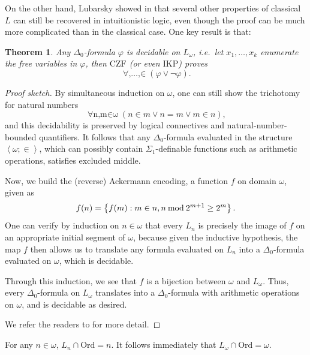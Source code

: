 \documentclass[12pt,openany]{book}
\theoremstyle{plain}
\newtheorem{theorem}{Theorem}[section]
\theoremstyle{definition}
\newcommand\uppar[1]{{\upshape(}#1{\upshape)}}
\newcommand\tuple[1]{\left\langle #1 \right\rangle}
\newcommand\opA[1]{\mathop{\forall #1}}
\newcommand\CZF{\mathrm{CZF}}
\newcommand\IKP{\mathrm{IKP}}
\newcommand\Ord{\mathrm{Ord}}
\begin{document}
On the other hand, Lubarsky showed in \cite{lubarsky93-intuitionistic-l} that several other properties of classical $L$ can still be recovered in intuitionistic logic, even though the proof can be much more complicated than in the classical case. One key result is that:
\begin{theorem}
  \label{thm:l-omega-dec}
  Any $\Delta_0$-formula $\varphi$ is decidable on $L_\omega$, i.e.\ let $x_1, \ldots, x_k$ enumerate the free variables in $\varphi$, then $\CZF$ \uppar{or even $\IKP$} proves
  \[\opA{x_1, \ldots, x_k \in L_\omega} \left(\varphi \lor \neg \varphi\right).\]
\end{theorem}

\begin{proof}[Proof sketch]
  By simultaneous induction on $\omega$, one can still show the trichotomy for natural numbers
  \[\opA{n, m \in \omega} \left(n \in m \lor n = m \lor m \in n\right),\]
  and this decidability is preserved by logical connectives and natural-number-bounded quantifiers. It follows that any $\Delta_0$-formula evaluated in the structure $\tuple{\omega; \in}$, which can possibly contain $\Sigma_1$-definable functions such as arithmetic operations, satisfies excluded middle.

  Now, we build the (reverse) Ackermann encoding, a function $f$ on domain $\omega$, given as
  \[f\mleft(n\mright) = \left\{f\mleft(m\mright) : m \in n, n \mathbin{\mathrm{mod}} 2^{m + 1} \geq 2^m\right\}.\]
  One can verify by induction on $n \in \omega$ that every $L_n$ is precisely the image of $f$ on an appropriate initial segment of $\omega$, because given the inductive hypothesis, the map $f$ then allows us to translate any formula evaluated on $L_n$ into a $\Delta_0$-formula evaluated on $\omega$, which is decidable.

  Through this induction, we see that $f$ is a bijection between $\omega$ and $L_\omega$. Thus, every $\Delta_0$-formula on $L_\omega$ translates into a $\Delta_0$-formula with arithmetic operations on $\omega$, and is decidable as desired.

  We refer the readers to \cite{lubarsky93-intuitionistic-l} for more detail.
\end{proof}

\begin{corollary}
  \label{cor:l-omega-ord}
  For any $n \in \omega$, $L_n \cap \Ord = n$. It follows immediately that $L_\omega \cap \Ord = \omega$.
\end{corollary}
\end{document}
